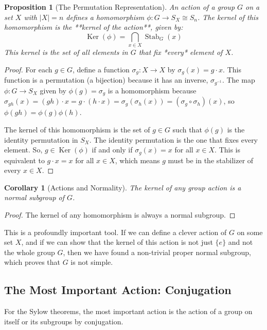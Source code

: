 \documentclass[12pt,a4paper]{article}
\theoremstyle{plain} %
\newtheorem{corollary}[theorem]{Corollary}
\newtheorem{proposition}[theorem]{Proposition}
\theoremstyle{definition} %
\theoremstyle{remark} %
\DeclareMathOperator{\Stab}{Stab}
\DeclareMathOperator{\Ker}{Ker}
\begin{document}
\begin{proposition}[The Permutation Representation]
An action of a group $G$ on a set $X$ with $|X|=n$ defines a homomorphism $\phi: G \to S_X \cong S_n$.
The kernel of this homomorphism is the **kernel of the action**, given by:
\[
\Ker(\phi) = \bigcap_{x \in X} \Stab_G(x)
\]
This kernel is the set of all elements in $G$ that fix *every* element of $X$.
\end{proposition}
\begin{proof}
For each $g \in G$, define a function $\sigma_g: X \to X$ by $\sigma_g(x) = g \cdot x$. This function is a permutation (a bijection) because it has an inverse, $\sigma_{g^{-1}}$. The map $\phi: G \to S_X$ given by $\phi(g) = \sigma_g$ is a homomorphism because $\sigma_{gh}(x) = (gh)\cdot x = g \cdot (h \cdot x) = \sigma_g(\sigma_h(x)) = (\sigma_g \circ \sigma_h)(x)$, so $\phi(gh) = \phi(g)\phi(h)$.

The kernel of this homomorphism is the set of $g \in G$ such that $\phi(g)$ is the identity permutation in $S_X$. The identity permutation is the one that fixes every element. So, $g \in \Ker(\phi)$ if and only if $\sigma_g(x) = x$ for all $x \in X$. This is equivalent to $g \cdot x = x$ for all $x \in X$, which means $g$ must be in the stabilizer of every $x \in X$.
\end{proof}

\begin{corollary}[Actions and Normality]
The kernel of any group action is a normal subgroup of $G$.
\end{corollary}
\begin{proof}
The kernel of any homomorphism is always a normal subgroup.
\end{proof}

This is a profoundly important tool. If we can define a clever action of $G$ on some set $X$, and if we can show that the kernel of this action is not just $\{e\}$ and not the whole group $G$, then we have found a non-trivial proper normal subgroup, which proves that $G$ is not simple.

\subsection{The Most Important Action: Conjugation}
For the Sylow theorems, the most important action is the action of a group on itself or its subgroups by conjugation.
\end{document}

